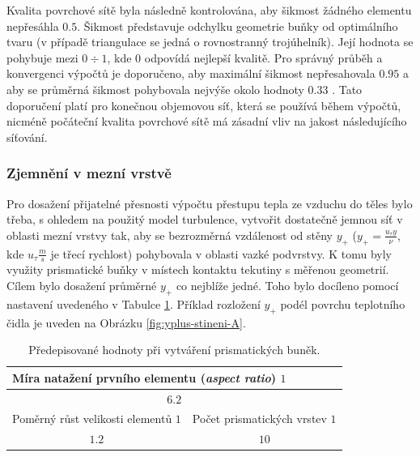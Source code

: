             Kvalita povrchové sítě byla následně kontrolována, aby šikmost žádného elementu nepřesáhla $0.5$. Šikmost představuje odchylku geometrie buňky od optimálního tvaru (v případě triangulace se jedná o rovnostranný trojúhelník). Její hodnota se pohybuje mezi $0 \div 1$, kde $0$ odpovídá nejlepší kvalitě. Pro správný průběh a konvergenci výpočtů je doporučeno, aby maximální šikmost nepřesahovala $0.95$ a aby se průměrná šikmost pohybovala nejvýše okolo hodnoty $0.33$ \cite{Ansys2020User}. Tato doporučení platí pro konečnou objemovou síť, která se používá během výpočtů, nicméně počáteční kvalita povrchové sítě má zásadní vliv na jakost následujícího síťování.
        \subsubsection{Zjemnění v mezní vrstvě}
            Pro dosažení přijatelné přesnosti výpočtu přestupu tepla ze vzduchu do těles bylo třeba, s ohledem na použitý model turbulence, vytvořit dostatečně jemnou síť v oblasti mezní vrstvy tak, aby se bezrozměrná vzdálenost od stěny $y _+$ ($y _+ = \frac{u _\tau y}{\nu}$, kde $u _\tau \unit{\frac{m}{s}}$ je třecí rychlost) pohybovala v oblasti vazké podvrstvy. K tomu byly využity prismatické buňky v místech kontaktu tekutiny s měřenou geometrií. Cílem bylo dosažení průměrné $y_+$ co nejblíže jedné. Toho bylo docíleno pomocí nastavení uvedeného v Tabulce \ref{tab:mezni-vrstva-nastaveni}. Příklad rozložení $y_+$ podél povrchu teplotního čidla je uveden na Obrázku \ref{fig:yplus-stineni-A}.

            \begin{table}[ht!]
                \centering
                \caption{Předepisované hodnoty při vytváření prismatických buněk.}
                \begin{tabular}{ll}
                    \multicolumn{2}{l}{Míra natažení prvního elementu (\textit{aspect ratio}) $\unit{1}$}                            \\ \hline
                    \multicolumn{2}{c}{$6.2$}                                                                        \\ \hline
                    \multicolumn{1}{l|}{Poměrný růst velikosti elementů $\unit{1}$} & Počet prismatických vrstev $\unit{1}$ \\ \hline
                    \multicolumn{1}{c|}{$1.2$}                                      & \multicolumn{1}{c}{$10$}                
                \end{tabular}
                \label{tab:mezni-vrstva-nastaveni}
            \end{table}

